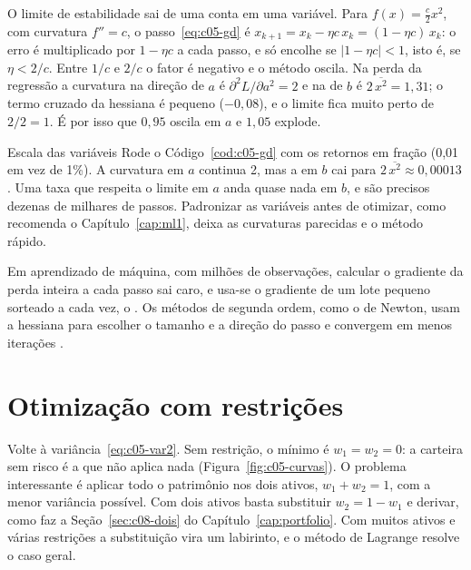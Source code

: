 O limite de estabilidade sai de uma conta em uma variável. Para $f(x) = \tfrac{c}{2}x^2$, com curvatura $f'' = c$, o passo~\eqref{eq:c05-gd} é $x_{k+1} = x_k - \eta c\,x_k = (1 - \eta c)\,x_k$: o erro é multiplicado por $1 - \eta c$ a cada passo, e só encolhe se $|1 - \eta c| < 1$, isto é, se $\eta < 2/c$. Entre $1/c$ e $2/c$ o fator é negativo e o método oscila. Na perda da regressão a curvatura na direção de $a$ é $\partial^2 L/\partial a^2 = 2$ e na de $b$ é $2\,\overline{x^2} = 1,31$; o termo cruzado da hessiana é pequeno ($-0,08$), e o limite fica muito perto de $2/2 = 1$. É por isso que $0,95$ oscila em $a$ e $1,05$ explode.

\begin{armadilha}{Escala das variáveis}
Rode o Código~\ref{cod:c05-gd} com os retornos em fração (0,01 em vez de 1\%). A curvatura em $a$ continua 2, mas a em $b$ cai para $2\,\overline{x^2} \approx 0,00013$. Uma taxa que respeita o limite em $a$ anda quase nada em $b$, e são precisos dezenas de milhares de passos. Padronizar as variáveis antes de otimizar, como recomenda o Capítulo~\ref{cap:ml1}, deixa as curvaturas parecidas e o método rápido.
\end{armadilha}

Em aprendizado de máquina, com milhões de observações, calcular o gradiente da perda inteira a cada passo sai caro, e usa-se o gradiente de um lote pequeno sorteado a cada vez, o . Os métodos de segunda ordem, como o de Newton, usam a hessiana para escolher o tamanho e a direção do passo e convergem em menos iterações \citep{nocedal2006}.

\section{Otimização com restrições}
\label{sec:c05-lagrange}

Volte à variância~\eqref{eq:c05-var2}. Sem restrição, o mínimo é $w_1 = w_2 = 0$: a carteira sem risco é a que não aplica nada (Figura~\ref{fig:c05-curvas}). O problema interessante é aplicar todo o patrimônio nos dois ativos, $w_1 + w_2 = 1$, com a menor variância possível. Com dois ativos basta substituir $w_2 = 1 - w_1$ e derivar, como faz a Seção~\ref{sec:c08-dois} do Capítulo~\ref{cap:portfolio}. Com muitos ativos e várias restrições a substituição vira um labirinto, e o método de Lagrange resolve o caso geral.

